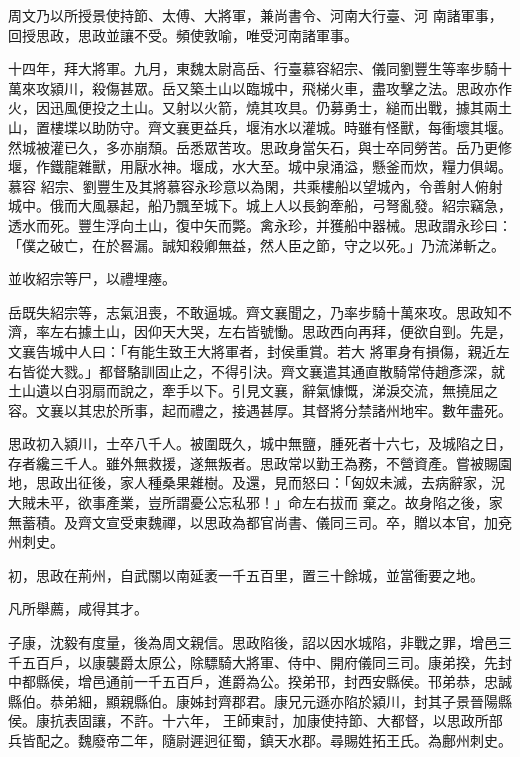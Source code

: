 \begin{pinyinscope}
 周文乃以所授景使持節、太傅、大將軍，兼尚書令、河南大行臺、河
 南諸軍事，回授思政，思政並讓不受。頻使敦喻，唯受河南諸軍事。



 十四年，拜大將軍。九月，東魏太尉高岳、行臺慕容紹宗、儀同劉豐生等率步騎十萬來攻潁川，殺傷甚眾。岳又築土山以臨城中，飛梯火車，盡攻擊之法。思政亦作火，因迅風便投之土山。又射以火箭，燒其攻具。仍募勇士，縋而出戰，據其兩土山，置樓堞以助防守。齊文襄更益兵，堰洧水以灌城。時雖有怪獸，每衝壞其堰。然城被灌已久，多亦崩頹。岳悉眾苦攻。思政身當矢石，與士卒同勞苦。岳乃更修堰，作鐵龍雜獸，用厭水神。堰成，水大至。城中泉涌溢，懸釜而炊，糧力俱竭。慕容
 紹宗、劉豐生及其將慕容永珍意以為閑，共乘樓船以望城內，令善射人俯射城中。俄而大風暴起，船乃飄至城下。城上人以長鉤牽船，弓弩亂發。紹宗竊急，透水而死。豐生浮向土山，復中矢而斃。禽永珍，并獲船中器械。思政謂永珍曰：「僕之破亡，在於晷漏。誠知殺卿無益，然人臣之節，守之以死。」乃流涕斬之。



 並收紹宗等尸，以禮埋瘞。



 岳既失紹宗等，志氣沮喪，不敢逼城。齊文襄聞之，乃率步騎十萬來攻。思政知不濟，率左右據土山，因仰天大哭，左右皆號慟。思政西向再拜，便欲自剄。先是，文襄告城中人曰：「有能生致王大將軍者，封侯重賞。若大
 將軍身有損傷，親近左右皆從大戮。」都督駱訓固止之，不得引決。齊文襄遣其通直散騎常侍趙彥深，就土山遺以白羽扇而說之，牽手以下。引見文襄，辭氣慷慨，涕淚交流，無撓屈之容。文襄以其忠於所事，起而禮之，接遇甚厚。其督將分禁諸州地牢。數年盡死。



 思政初入潁川，士卒八千人。被圍既久，城中無鹽，腫死者十六七，及城陷之日，存者纔三千人。雖外無救援，遂無叛者。思政常以勤王為務，不營資產。嘗被賜園地，思政出征後，家人種桑果雜樹。及還，見而怒曰：「匈奴未滅，去病辭家，況大賊未平，欲事產業，豈所謂憂公忘私邪！」命左右拔而
 棄之。故身陷之後，家無蓄積。及齊文宣受東魏禪，以思政為都官尚書、儀同三司。卒，贈以本官，加兗州刺史。



 初，思政在荊州，自武關以南延袤一千五百里，置三十餘城，並當衝要之地。



 凡所舉薦，咸得其才。



 子康，沈毅有度量，後為周文親信。思政陷後，詔以因水城陷，非戰之罪，增邑三千五百戶，以康襲爵太原公，除驃騎大將軍、侍中、開府儀同三司。康弟揆，先封中都縣侯，增邑通前一千五百戶，進爵為公。揆弟邗，封西安縣侯。邗弟恭，忠誠縣伯。恭弟細，顯親縣伯。康姊封齊郡君。康兄元遜亦陷於潁川，封其子景晉陽縣侯。康抗表固讓，不許。十六年，
 王師東討，加康使持節、大都督，以思政所部兵皆配之。魏廢帝二年，隨尉遲迥征蜀，鎮天水郡。尋賜姓拓王氏。為鄜州刺史。




\end{pinyinscope}
